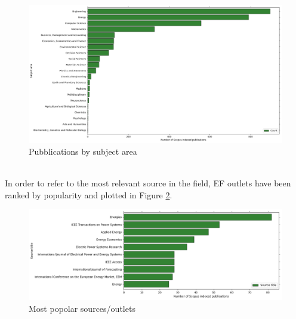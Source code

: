 \begin{figure}
  \includegraphics[width=\textwidth]{images/subject_area.png}
  \caption{Pubblications by subject area}
  \label{fig:subject_area}
\end{figure}
\\
In order to refer to the most relevant source in the field, EF outlets have been ranked by popularity and plotted in Figure \ref{fig:src_title}.
\begin{figure}
  \includegraphics[width=\textwidth]{images/src_title.png}
  \caption{Most popolar sources/outlets}
  \label{fig:src_title}
\end{figure}
\\
